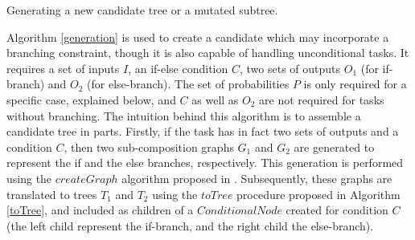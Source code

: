 \documentclass[conference]{IEEEtran}
\begin{document}
\begin{algorithm}
 \setlength{}
 \LinesNumbered
 \SetNlSty{}{}{:}
 \vspace{2mm}
 \caption{\footnotesize Generating a new candidate tree or a mutated subtree.}
\label{generation}
\end{algorithm}

Algorithm \ref{generation} is used to create a candidate which may incorporate a branching constraint, though it is also capable of handling unconditional tasks. It requires a
set of inputs $I$, an if-else condition $C$, two sets of outputs $O_1$ (for if-branch) and $O_2$ (for else-branch). The set of probabilities $P$ is only required for a specific case, explained below, and $C$ as well as $O_2$ are not required for tasks without branching. The intuition behind this algorithm is to assemble a candidate tree in parts. Firstly, if the task has in fact two sets of outputs and a condition $C$, then two sub-composition graphs $G_1$ and $G_2$ are generated to represent the if and the else branches, respectively. This generation is performed using the $createGraph$ algorithm proposed in \cite{wang2013genetic}. Subsequently, these graphs are translated to trees $T_1$ and $T_2$ using the $toTree$ procedure proposed in Algorithm \ref{toTree}, and included as children of a $ConditionalNode$ created for condition $C$ (the left child represent the if-branch, and the right child the else-branch).
\end{document}
